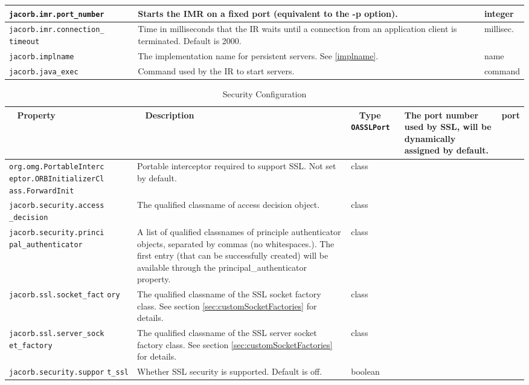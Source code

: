 {{\begin{small}
\begin{longtable}{|p{5cm}|p{9cm}|p{2cm}|}
\hline
\verb"jacorb.imr.port_number" & Starts the IMR on a fixed port (equivalent to the -p option). & integer \\
\hline
\verb"jacorb.imr.connection_"
\verb"timeout" & Time in milliseconds that the IR waits until a connection from an application client is terminated. Default is 2000. & millisec. \\
\hline
\verb"jacorb.implname" & The implementation name for persistent servers. See \ref{implname}. & name \\
\hline
\verb"jacorb.java_exec" & Command used by the IR to start servers. & command \\
\hline

\end{longtable}
\end{small}


\begin{small}
\begin{longtable}{|p{5cm}|p{9cm}|p{2cm}|}
\caption{Security Configuration}\\
\hline
~ \hfill \textbf {Property} \hfill ~ & ~ \hfill \textbf {Description} \hfill ~ & ~ \hfill \textbf {Type} \hfill ~ \endhead
\hline
\verb"OASSLPort" & The port number used by SSL, will be dynamically assigned by default. & port \\
\hline
\verb"org.omg.PortableInterc"
\verb"eptor.ORBInitializerCl"
\verb"ass.ForwardInit" & Portable interceptor required to support SSL. Not set by default. & class \\
\hline
\verb"jacorb.security.access"
\verb"_decision" & The qualified classname of access decision object. & class \\
\hline
\verb"jacorb.security.princi"
\verb"pal_authenticator" & A list of qualified classnames of principle authenticator objects, separated by commas (no whitespaces.). The first entry (that can be successfully created) will be available through the principal\_authenticator property. & class \\
\hline
\verb"jacorb.ssl.socket_fact"
\verb"ory" & The qualified classname of the SSL socket factory class. See section \ref{sec:customSocketFactories} for details.& class \\
\hline
\verb"jacorb.ssl.server_sock"
\verb"et_factory" & The qualified classname of the SSL server socket factory class. See section \ref{sec:customSocketFactories} for details.& class \\
\hline
\verb"jacorb.security.suppor"
\verb"t_ssl" & Whether SSL security is supported. Default is off. & boolean \\

\end{longtable}
\end{small}}}
